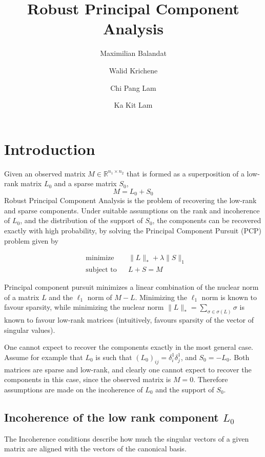 \documentclass{../common/projectreport}
\title{\Large Robust Principal Component Analysis}
\author{Maximilian Balandat \and Walid Krichene \and Chi Pang Lam \and Ka Kit Lam}
\begin{document}
\maketitle

\section{Introduction}
Given an observed matrix $M \in \mathbb{R}^{n_1 \times n_2}$ that is formed as a superposition of a low-rank matrix $L_0$ and a sparse matrix $S_0$, 
\[
M = L_0 + S_0
\]
Robust Principal Component Analysis \cite{Candes:2011fk} is the problem of recovering the low-rank and sparse components. Under suitable assumptions on the rank and incoherence of $L_0$, and the distribution of the support of $S_0$, the components can be recovered exactly with high probability, by solving the Principal Component Pursuit (PCP) problem given by

\begin{equation}
\begin{aligned}
&\text{minimize} && \|L\|_* + \lambda \|S\|_1 \\
&\text{subject to} && L+S = M
\label{PCP}
\end{aligned}
\end{equation}

Principal component pursuit minimizes a linear combination of the nuclear norm of a matrix $L$ and the $\ell_1$ norm of $M-L$. Minimizing the $\ell_1$ norm is known to favour sparsity, while minimizing the nuclear norm $\|L\|_* = \sum_{\sigma \in \sigma(L)} \sigma$ is known to favour low-rank matrices (intuitively, favours sparsity of the vector of singular values).

One cannot expect to recover the components exactly in the most general case. Assume for example that $L_0$ is such that $(L_0)_{ij} = \delta_i^1\delta_j^1$, and $S_0 = -L_0$. Both matrices are sparse and low-rank, and clearly one cannot expect to recover the components in this case, since the observed matrix is $M = 0$. Therefore assumptions are made on the incoherence of $L_0$ and the support of $S_0$.

\subsection{Incoherence of the low rank component $L_0$}
The Incoherence conditions describe how much the singular vectors of a given matrix are aligned with the vectors of the canonical basis.
\end{document}
